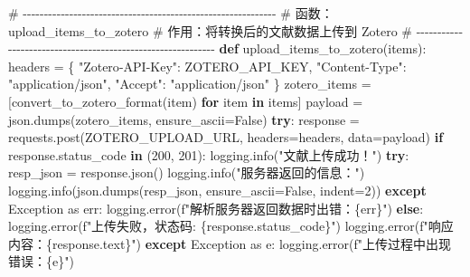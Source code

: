 \documentclass[
  letterpaper,
  DIV=11,
  numbers=noendperiod]{scrreprt}
\newenvironment{Shaded}{\begin{snugshade}}{\end{snugshade}}
\newcommand{\CommentTok}[1]{\textcolor[rgb]{0.37,0.37,0.37}{#1}}
\newcommand{\ControlFlowTok}[1]{\textcolor[rgb]{0.00,0.23,0.31}{\textbf{#1}}}
\newcommand{\DecValTok}[1]{\textcolor[rgb]{0.68,0.00,0.00}{#1}}
\newcommand{\ImportTok}[1]{\textcolor[rgb]{0.00,0.46,0.62}{#1}}
\newcommand{\KeywordTok}[1]{\textcolor[rgb]{0.00,0.23,0.31}{\textbf{#1}}}
\newcommand{\NormalTok}[1]{\textcolor[rgb]{0.00,0.23,0.31}{#1}}
\newcommand{\OperatorTok}[1]{\textcolor[rgb]{0.37,0.37,0.37}{#1}}
\newcommand{\PreprocessorTok}[1]{\textcolor[rgb]{0.68,0.00,0.00}{#1}}
\newcommand{\SpecialCharTok}[1]{\textcolor[rgb]{0.37,0.37,0.37}{#1}}
\newcommand{\SpecialStringTok}[1]{\textcolor[rgb]{0.13,0.47,0.30}{#1}}
\newcommand{\StringTok}[1]{\textcolor[rgb]{0.13,0.47,0.30}{#1}}
\newcommand{\VariableTok}[1]{\textcolor[rgb]{0.07,0.07,0.07}{#1}}
\begin{document}
\begin{Shaded}
\begin{Highlighting}[]
\CommentTok{\# {-}{-}{-}{-}{-}{-}{-}{-}{-}{-}{-}{-}{-}{-}{-}{-}{-}{-}{-}{-}{-}{-}{-}{-}{-}{-}{-}{-}{-}{-}{-}{-}{-}{-}{-}{-}{-}{-}{-}{-}{-}{-}{-}{-}{-}{-}{-}{-}{-}{-}{-}{-}{-}{-}{-}{-}{-}{-}{-}{-}}
\CommentTok{\# 函数：upload\_items\_to\_zotero}
\CommentTok{\# 作用：将转换后的文献数据上传到 Zotero}
\CommentTok{\# {-}{-}{-}{-}{-}{-}{-}{-}{-}{-}{-}{-}{-}{-}{-}{-}{-}{-}{-}{-}{-}{-}{-}{-}{-}{-}{-}{-}{-}{-}{-}{-}{-}{-}{-}{-}{-}{-}{-}{-}{-}{-}{-}{-}{-}{-}{-}{-}{-}{-}{-}{-}{-}{-}{-}{-}{-}{-}{-}{-}}
\KeywordTok{def}\NormalTok{ upload\_items\_to\_zotero(items):}
\NormalTok{    headers }\OperatorTok{=}\NormalTok{ \{}
        \StringTok{"Zotero{-}API{-}Key"}\NormalTok{: ZOTERO\_API\_KEY,}
        \StringTok{"Content{-}Type"}\NormalTok{: }\StringTok{"application/json"}\NormalTok{,}
        \StringTok{"Accept"}\NormalTok{: }\StringTok{"application/json"}
\NormalTok{    \}}
\NormalTok{    zotero\_items }\OperatorTok{=}\NormalTok{ [convert\_to\_zotero\_format(item) }\ControlFlowTok{for}\NormalTok{ item }\KeywordTok{in}\NormalTok{ items]}
\NormalTok{    payload }\OperatorTok{=}\NormalTok{ json.dumps(zotero\_items, ensure\_ascii}\OperatorTok{=}\VariableTok{False}\NormalTok{)}
    \ControlFlowTok{try}\NormalTok{:}
\NormalTok{        response }\OperatorTok{=}\NormalTok{ requests.post(ZOTERO\_UPLOAD\_URL, headers}\OperatorTok{=}\NormalTok{headers, data}\OperatorTok{=}\NormalTok{payload)}
        \ControlFlowTok{if}\NormalTok{ response.status\_code }\KeywordTok{in}\NormalTok{ (}\DecValTok{200}\NormalTok{, }\DecValTok{201}\NormalTok{):}
\NormalTok{            logging.info(}\StringTok{"文献上传成功！"}\NormalTok{)}
            \ControlFlowTok{try}\NormalTok{:}
\NormalTok{                resp\_json }\OperatorTok{=}\NormalTok{ response.json()}
\NormalTok{                logging.info(}\StringTok{"服务器返回的信息："}\NormalTok{)}
\NormalTok{                logging.info(json.dumps(resp\_json, ensure\_ascii}\OperatorTok{=}\VariableTok{False}\NormalTok{, indent}\OperatorTok{=}\DecValTok{2}\NormalTok{))}
            \ControlFlowTok{except} \PreprocessorTok{Exception} \ImportTok{as}\NormalTok{ err:}
\NormalTok{                logging.error(}\SpecialStringTok{f"解析服务器返回数据时出错：}\SpecialCharTok{\{}\NormalTok{err}\SpecialCharTok{\}}\SpecialStringTok{"}\NormalTok{)}
        \ControlFlowTok{else}\NormalTok{:}
\NormalTok{            logging.error(}\SpecialStringTok{f"上传失败，状态码: }\SpecialCharTok{\{}\NormalTok{response}\SpecialCharTok{.}\NormalTok{status\_code}\SpecialCharTok{\}}\SpecialStringTok{"}\NormalTok{)}
\NormalTok{            logging.error(}\SpecialStringTok{f"响应内容：}\SpecialCharTok{\{}\NormalTok{response}\SpecialCharTok{.}\NormalTok{text}\SpecialCharTok{\}}\SpecialStringTok{"}\NormalTok{)}
    \ControlFlowTok{except} \PreprocessorTok{Exception} \ImportTok{as}\NormalTok{ e:}
\NormalTok{        logging.error(}\SpecialStringTok{f"上传过程中出现错误：}\SpecialCharTok{\{}\NormalTok{e}\SpecialCharTok{\}}\SpecialStringTok{"}\NormalTok{)}
\end{Highlighting}
\end{Shaded}
\end{document}
